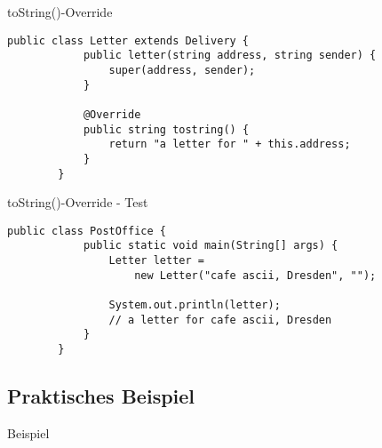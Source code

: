 \begin{frame}[fragile]{toString()-Override}
    \begin{lstlisting}[gobble=8]
        public class Letter extends Delivery {
            public letter(string address, string sender) {
                super(address, sender);
            }
        
            @Override
            public string tostring() {
                return "a letter for " + this.address;
            }	
        }
	\end{lstlisting}
\end{frame}

\begin{frame}[fragile]{toString()-Override - Test}
    \begin{lstlisting}[gobble=8]
        public class PostOffice {
            public static void main(String[] args) {	    
                Letter letter = 
                    new Letter("cafe ascii, Dresden", "");
                
                System.out.println(letter);
                // a letter for cafe ascii, Dresden
            }
        }
	\end{lstlisting}
\end{frame}

\subsection{Praktisches Beispiel}
\begin{frame}{Beispiel}
\end{frame}


